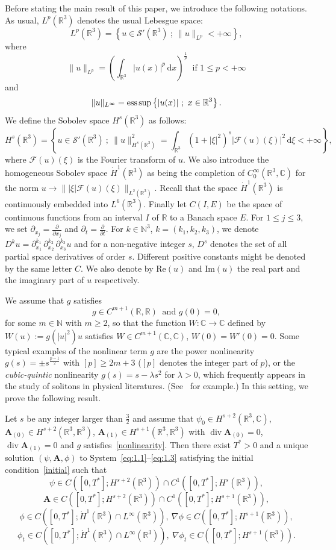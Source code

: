 \documentclass[AHL,Unicode,longabstracts]{cedram}
\newcommand{\BA}{\mathbf{A}}
\newcommand{\R}{\mathbb{R}}
\newcommand{\Com}{\mathbb{C}}
\newcommand{\N}{\mathbb{N}}
\DeclareMathOperator{\Div}{div}
\newcommand*{\dd}{\mathrm{d}}
\newcommand*{\dx}{\dd x}
\newcommand*{\dxi}{\dd\xi}
\begin{document}
Before stating the main result of this paper, we introduce the following notations. As usual, $L^p(\R^3)$ denotes the usual Lebesgue space:
\[
L^p(\R^3)=\left\{ u \in \mathcal{S}'(\R^3) \ ; \ \| u \| _{L^p} <+\infty \right\},
\]
where
\[
\| u \|_{L^p}=\left(\int_{\R^3} |u(x)|^p \,\dx \right)^{\frac{1}{p}} \
\text{ if } 1\leq p<+\infty
\]
and
\[
\| u \|_{L^{\infty}} =\text{ess\,sup}\left\{ |u(x)| \ ; \ x\in\R^3 \right\}.
\]
We define the Sobolev space $H^s(\R^3)$ as follows:
\[
H^s(\R^3)=\left \{u \in \mathcal{S}'(\R^3) \ ; \ \| u \|_{H^s(\R^3)}^2 = \int_{\R^3} (1+|\xi| ^2)^s |\mathcal{F}(u)(\xi)|^ 2 \,\dxi < +\infty \right \},
\]
where $\mathcal{F}(u)(\xi)$ is the Fourier transform of $u$. We also introduce the homogeneous Sobolev space $\dot{H}^1(\R^3)$ as being the completion of $C^{\infty}_0(\R^3,\Com)$ for the norm $u \to \| |\xi| \mathcal{F}(u)(\xi) \|_{L^2(\R^3)}$. Recall that the space $\dot{H}^1(\R^3)$ is continuously embedded into $L^6(\R^3)$. Finally let $C(I,E)$ be the space of continuous functions from an interval $I$ of $\R$ to a Banach space $E$. For $1\leq j \leq 3$, we set $\partial_{x_j}=\frac{\partial}{\partial x_j}$ and $\partial_{t}=\frac{\partial}{\partial t}$. For $k\in \N^3$, $k=(k_1,k_2,k_3)$, we denote $D^k u=\partial_{x_1}^{k_1} \, \partial_{x_2}^{k_2} \, \partial_{x_3}^{k_3} u$ and for a non-negative integer $s$, $D^s$ denotes the set of all partial space derivatives of order $s$. Different positive constants might be denoted by the same letter $C$. We also denote by $\text{Re}(u)$ and $\text{Im}(u)$ the real part and the imaginary part of $u$ respectively.

We assume that $g$ satisfies
\begin{equation}\label{nonlinearity}
g \in C^{m+1}(\R,\R) \ \text{ and } g(0)=0,
\end{equation}
for some $m \in \N$ with $m \ge 2$, so that the function $W:\Com \to \Com$ defined by $W(u):=g(|u|^2)u$ satisfies $W\in C^{m+1}(\Com,\Com)$, $W(0)=W'(0)=0$. Some typical examples of the nonlinear term $g$ are the power nonlinearity $g(s)=\pm s^{\frac{p-1}{2}}$ with $[p]\ge 2m+3$ ($[p]$ denotes the integer part of $p$), or the \emph{cubic-quintic} nonlinearity $g(s)= s-\lambda s^2$ for $\lambda>0$, which frequently appears in the study of solitons in physical literatures. (See~\cite{RV} for example.) In this setting, we prove the following result.

\begin{theo}\label{th1}
Let $s$ be any integer larger than $\frac{3}{2}$ and assume that $\psi_0\in H^{s+2}(\R^3,\Com)$, $\BA_{(0)}\in H^{s+2}(\R^3,\R^3)$, $\BA_{(1)} \in H^{s+1}(\R^3,\R^3)$ with $\Div \BA_{(0)}=0$, $\Div \BA_{(1)}=0$ and $g$ satisfies~\eqref{nonlinearity}. Then there exist $T^*>0$ and a unique solution $(\psi,\BA,\phi)$ to System~\eqref{eq:1.1}--\eqref{eq:1.3} satisfying the initial condition~\eqref{initial} such that
\[
\psi \in C([0,T^*];H^{s+2}(\R^3)) \cap C^1([0,T^*]; H^s(\R^3)),
\]
\[
\BA \in C([0,T^*];H^{s+2}(\R^3)) \cap C^1([0,T^*];H^{s+1}(\R^3)),
\]
\[
\phi \in C([0,T^*];\dot{H}^1(\R^3)\cap L^{\infty}(\R^3)), \
\nabla \phi \in C([0,T^*];H^{s+1}(\R^3)),
\]
\[
\phi_t \in C([0,T^*];\dot{H}^1(\R^3) \cap L^{\infty}(\R^3)), \
\nabla \phi_t \in C([0,T^*];H^{s+1}(\R^3)).
\]
\end{theo}
\end{document}
